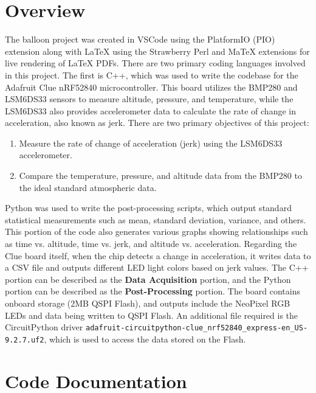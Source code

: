 \documentclass[12pt]{report}
\begin{document}
\chapter*{Overview}
The balloon project was created in VSCode using the PlatformIO (PIO) extension along with LaTeX using the Strawberry Perl and MaTeX extensions for live rendering of LaTeX PDFs. There are two primary coding languages involved in this project. The first is C++, which was used to write the codebase for the Adafruit Clue nRF52840 microcontroller. This board utilizes the BMP280 and LSM6DS33 sensors to measure altitude, pressure, and temperature, while the LSM6DS33 also provides accelerometer data to calculate the rate of change in acceleration, also known as jerk. \newline
There are two primary objectives of this project:
\begin{enumerate}
    \item Measure the rate of change of acceleration (jerk) using the LSM6DS33 accelerometer.
    \item Compare the temperature, pressure, and altitude data from the BMP280 to the ideal standard atmospheric data.
\end{enumerate}
Python was used to write the post-processing scripts, which output standard statistical measurements such as mean, standard deviation, variance, and others. This portion of the code also generates various graphs showing relationships such as time vs. altitude, time vs. jerk, and altitude vs. acceleration. \newline
Regarding the Clue board itself, when the chip detects a change in acceleration, it writes data to a CSV file and outputs different LED light colors based on jerk values. The C++ portion can be described as the \textbf{Data Acquisition} portion, and the Python portion can be described as the \textbf{Post-Processing} portion. \newline
The board contains onboard storage (2MB QSPI Flash), and outputs include the NeoPixel RGB LEDs and data being written to QSPI Flash. An additional file required is the CircuitPython driver \texttt{adafruit-circuitpython-clue\_nrf52840\_express-en\_US-9.2.7.uf2}, which is used to access the data stored on the Flash.

\chapter{Code Documentation}
\end{document}
